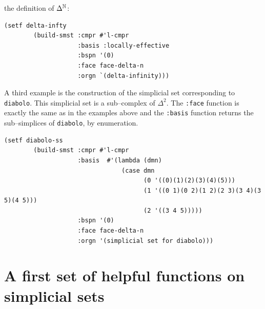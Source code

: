 the definition of $\Delta^{{\Bbb N}}$:
{\footnotesize\begin{verbatim}
(setf delta-infty
        (build-smst :cmpr #'l-cmpr
                    :basis :locally-effective
                    :bspn '(0)
                    :face face-delta-n
                    :orgn `(delta-infinity)))
\end{verbatim}}
\vskip 0.40cm
A third example is the construction of the simplicial set corresponding to  {\tt diabolo}. This 
simplicial set is a  sub--complex of $\Delta^2$.
The {\tt :face} function is exactly the same as in the examples above and the {\tt :basis} function returns
the sub--simplices of {\tt diabolo}, by enumeration. 
{\footnotesize \begin{verbatim}
(setf diabolo-ss 
        (build-smst :cmpr #'l-cmpr
                    :basis  #'(lambda (dmn)
                                (case dmn
                                      (0 '((0)(1)(2)(3)(4)(5)))
                                      (1 '((0 1)(0 2)(1 2)(2 3)(3 4)(3 5)(4 5)))
                                      (2 '((3 4 5)))))
                    :bspn '(0)
                    :face face-delta-n
                    :orgn '(simplicial set for diabolo)))
\end{verbatim}}
\newpage

\section {A first set of helpful functions on simplicial sets}

